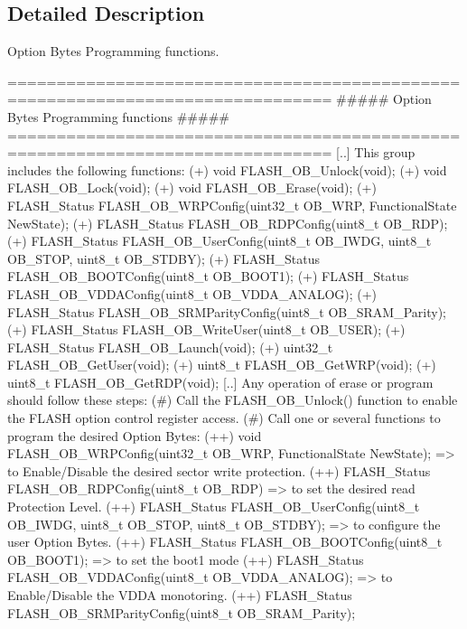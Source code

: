\subsection{Detailed Description}
Option Bytes Programming functions. \begin{DoxyVerb} ===============================================================================
                ##### Option Bytes Programming functions #####
 ===============================================================================  
    [..] This group includes the following functions:
         (+) void FLASH_OB_Unlock(void);
         (+) void FLASH_OB_Lock(void);
         (+) void FLASH_OB_Erase(void);
         (+) FLASH_Status FLASH_OB_WRPConfig(uint32_t OB_WRP, FunctionalState NewState);
         (+) FLASH_Status FLASH_OB_RDPConfig(uint8_t OB_RDP);
         (+) FLASH_Status FLASH_OB_UserConfig(uint8_t OB_IWDG, uint8_t OB_STOP, uint8_t OB_STDBY);
         (+) FLASH_Status FLASH_OB_BOOTConfig(uint8_t OB_BOOT1);
         (+) FLASH_Status FLASH_OB_VDDAConfig(uint8_t OB_VDDA_ANALOG);
         (+) FLASH_Status FLASH_OB_SRMParityConfig(uint8_t OB_SRAM_Parity);
         (+) FLASH_Status FLASH_OB_WriteUser(uint8_t OB_USER);                                  
         (+) FLASH_Status FLASH_OB_Launch(void);
         (+) uint32_t FLASH_OB_GetUser(void);                                           
         (+) uint8_t FLASH_OB_GetWRP(void);                                             
         (+) uint8_t FLASH_OB_GetRDP(void);                                                     
    [..] Any operation of erase or program should follow these steps:
         (#) Call the FLASH_OB_Unlock() function to enable the FLASH option control 
             register access.
         (#) Call one or several functions to program the desired Option Bytes:
             (++) void FLASH_OB_WRPConfig(uint32_t OB_WRP, FunctionalState NewState); 
                  => to Enable/Disable the desired sector write protection.
             (++) FLASH_Status FLASH_OB_RDPConfig(uint8_t OB_RDP) => to set the 
                  desired read Protection Level.
             (++) FLASH_Status FLASH_OB_UserConfig(uint8_t OB_IWDG, uint8_t OB_STOP, uint8_t OB_STDBY); 
                  => to configure the user Option Bytes.
                 (++) FLASH_Status FLASH_OB_BOOTConfig(uint8_t OB_BOOT1); 
                  => to set the boot1 mode
             (++) FLASH_Status FLASH_OB_VDDAConfig(uint8_t OB_VDDA_ANALOG); 
                  => to Enable/Disable the VDDA monotoring.
             (++) FLASH_Status FLASH_OB_SRMParityConfig(uint8_t OB_SRAM_Parity); 

\end{DoxyVerb}
